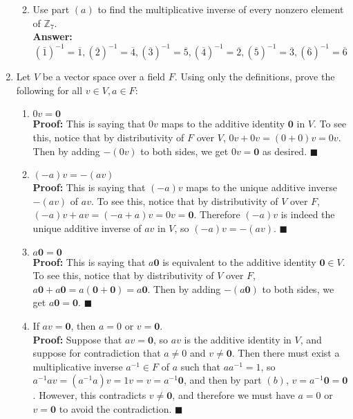 \documentclass[11pt,twoside]{article}
\newcommand{\Z}{\mathbb{Z}}
\newcounter{a}
\newcommand{\ovl}[1]{\overline{#1}}
\begin{document}
\begin{enumerate}
\begin{enumerate}
                    \def\N{7}
                    \begin{tabular}{c|*{\N}{c}}
                        \rows{\N}\\
                        \bottomrule
                    \end{tabular}
              \item Use part $ (a) $ to find the multiplicative inverse of every nonzero element of $\Z_7$. \\
                    \textbf{Answer:}\[(\ovl{1})^{-1}=\ovl{1}, (\ovl{2})^{-1}=\ovl{4}, (\ovl{3})^{-1}=\ovl{5}, (\ovl{4})^{-1}=\ovl{2}, (\ovl{5})^{-1}=\ovl{3}, (\ovl{6})^{-1}=\ovl{6}\]

          \end{enumerate}

    \item Let $V$ be a vector space over a field $F$. Using only the definitions, prove the following for all $v \in{V}, a\in{F}$:
          \begin{enumerate}
              \item $0v=\mathbf{0}$ \\
                    \textbf{Proof:} This is saying that $0v$ maps to the additive identity $\mathbf{0}$ in $V$. To see this, notice that by distributivity of $F$ over $V$, $0v+0v=(0+0)v=0v$. Then by adding $-(0v)$ to both sides, we get $0v = \mathbf{0}$ as desired. $\blacksquare$
              \item $(-a)v=-(av)$ \\
                    \textbf{Proof:} This is saying that $(-a)v$ maps to the unique additive inverse $-(av)$ of $av$. To see this, notice that by distributivity of $V$ over $F$, $(-a)v+av=(-a+a)v=0v=\mathbf{0}$. Therefore $(-a)v$ is indeed the unique additive inverse of $av$ in $V$, so $(-a)v=-(av)$. $\blacksquare$
              \item $a\mathbf{0}=\mathbf{0}$ \\
                    \textbf{Proof:} This is saying that $a\mathbf{0}$ is equivalent to the additive identity $\mathbf{0}\in V$. To see this, notice that by distributivity of $V$ over $F$, $a\mathbf{0} + a\mathbf{0}=a(\mathbf{0} + \mathbf{0})=a\mathbf{0}$. Then by adding $ -(a\mathbf{0}) $ to both sides, we get $a\mathbf{0}=\mathbf{0}$. $\blacksquare$
              \item If $av=\mathbf{0}$, then $a=0$ or $v=\mathbf{0}$. \\
                    \textbf{Proof:} Suppose that $av=\mathbf{0}$, so $av$ is the additive identity in $V$, and suppose for contradiction that $a\ne 0$ and $v\ne\mathbf{0}$. Then there must exist a multiplicative inverse $a^{-1}\in F$ of $a$ such that $aa^{-1}=1$, so $a^{-1}av=(a^{-1}a)v=1v=v=a^{-1}\mathbf{0}$, and then by part $(b)$, $v=a^{-1}\mathbf{0}=\mathbf{0}$. However, this contradicts $v\ne\mathbf{0}$, and therefore we must have $a=0$ or $v=\mathbf{0}$ to avoid the contradiction. $\blacksquare$
          \end{enumerate}


\end{enumerate}
\end{document}
